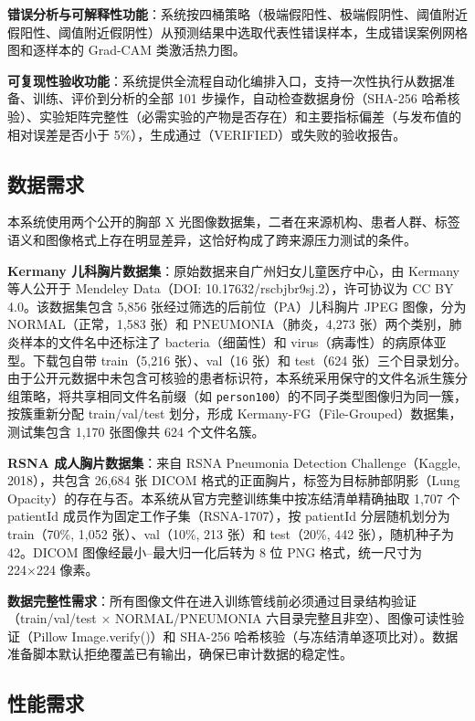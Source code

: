 \documentclass[12pt,a4paper,UTF8,openany]{ctexbook}
\begin{document}
\textbf{错误分析与可解释性功能}：系统按四桶策略（极端假阳性、极端假阴性、阈值附近假阳性、阈值附近假阴性）从预测结果中选取代表性错误样本，生成错误案例网格图和逐样本的 Grad-CAM 类激活热力图。

\textbf{可复现性验收功能}：系统提供全流程自动化编排入口，支持一次性执行从数据准备、训练、评价到分析的全部 101 步操作，自动检查数据身份（SHA-256 哈希核验）、实验矩阵完整性（必需实验的产物是否存在）和主要指标偏差（与发布值的相对误差是否小于 5\%），生成通过（VERIFIED）或失败的验收报告。

\subsection{数据需求}

本系统使用两个公开的胸部 X 光图像数据集，二者在来源机构、患者人群、标签语义和图像格式上存在明显差异，这恰好构成了跨来源压力测试的条件。

\textbf{Kermany 儿科胸片数据集}：原始数据来自广州妇女儿童医疗中心，由 Kermany 等人公开于 Mendeley Data（DOI: 10.17632/rscbjbr9sj.2），许可协议为 CC BY 4.0\cite{kermany2018}。该数据集包含 5,856 张经过筛选的后前位（PA）儿科胸片 JPEG 图像，分为 NORMAL（正常，1,583 张）和 PNEUMONIA（肺炎，4,273 张）两个类别，肺炎样本的文件名中还标注了 bacteria（细菌性）和 virus（病毒性）的病原体亚型。下载包自带 train（5,216 张）、val（16 张）和 test（624 张）三个目录划分。由于公开元数据中未包含可核验的患者标识符，本系统采用保守的文件名派生簇分组策略，将共享相同文件名前缀（如 \texttt{person100}）的不同子类型图像归为同一簇，按簇重新分配 train/val/test 划分，形成 Kermany-FG（File-Grouped）数据集，测试集包含 1,170 张图像共 624 个文件名簇。

\textbf{RSNA 成人胸片数据集}：来自 RSNA Pneumonia Detection Challenge\cite{rsna2018}（Kaggle, 2018），共包含 26,684 张 DICOM 格式的正面胸片，标签为目标肺部阴影（Lung Opacity）的存在与否。本系统从官方完整训练集中按冻结清单精确抽取 1,707 个 patientId 成员作为固定工作子集（RSNA-1707），按 patientId 分层随机划分为 train（70\%, 1,052 张）、val（10\%, 213 张）和 test（20\%, 442 张），随机种子为 42。DICOM 图像经最小--最大归一化后转为 8 位 PNG 格式，统一尺寸为 224×224 像素。

\textbf{数据完整性需求}：所有图像文件在进入训练管线前必须通过目录结构验证（train/val/test × NORMAL/PNEUMONIA 六目录完整且非空）、图像可读性验证（Pillow Image.verify()）和 SHA-256 哈希核验（与冻结清单逐项比对）。数据准备脚本默认拒绝覆盖已有输出，确保已审计数据的稳定性。

\subsection{性能需求}
\end{document}
